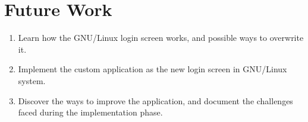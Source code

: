 \chapter{Future Work}

\begin{enumerate}
  \item Learn how the GNU/Linux login screen works, and possible ways to overwrite it.
  \item Implement the custom application as the new login screen in GNU/Linux system.
  \item Discover the ways to improve the application, and document the challenges
        faced during the implementation phase.
\end{enumerate}
